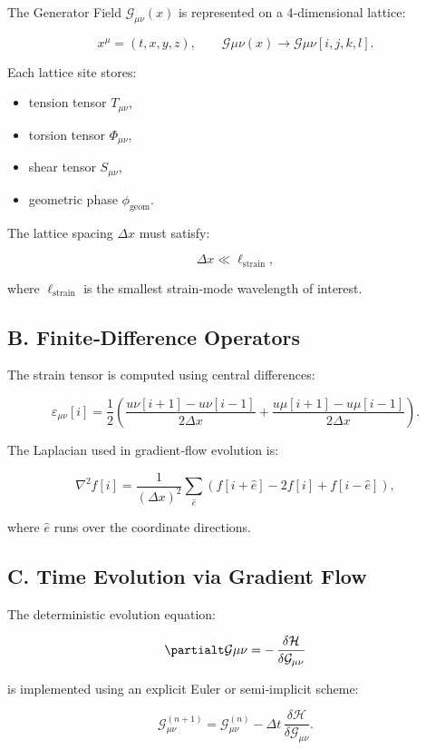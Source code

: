 \documentclass[reprint,amsmath,amssymb,aps,prl,floatfix]{revtex4-2}
\begin{document}
\begin{itemize}
The Generator Field \(\mathcal{G}_{\mu\nu}(x)\) is represented on a 4‑dimensional lattice:

\[
x^\mu = (t, x, y, z),
\qquad
\mathcal{G}{\mu\nu}(x) \rightarrow \mathcal{G}{\mu\nu}[i,j,k,l].
\]

Each lattice site stores:

\begin{itemize}
\item tension tensor \(T_{\mu\nu}\),  
\item torsion tensor \(\Phi_{\mu\nu}\),  
\item shear tensor \(S_{\mu\nu}\),  
\item geometric phase \(\phi_{\mathrm{geom}}\).
\end{itemize}

The lattice spacing \(\Delta x\) must satisfy:

\[
\Delta x \ll \ell_{\mathrm{strain}},
\]

where \(\ell_{\mathrm{strain}}\) is the smallest strain‑mode wavelength of interest.

\subsection{B. Finite‑Difference Operators}

The strain tensor is computed using central differences:

\[
\varepsilon_{\mu\nu}[i]
=
\frac{1}{2}
\left(
\frac{u\nu[i+1] - u\nu[i-1]}{2\Delta x}
+
\frac{u\mu[i+1] - u\mu[i-1]}{2\Delta x}
\right).
\]

The Laplacian used in gradient‑flow evolution is:

\[
\nabla^2 f[i]
=
\frac{1}{(\Delta x)^2}
\sum_{\hat{e}}
\left(
f[i+\hat{e}] - 2f[i] + f[i-\hat{e}]
\right),
\]

where \(\hat{e}\) runs over the coordinate directions.

\subsection{C. Time Evolution via Gradient Flow}

The deterministic evolution equation:

\[
\partialt \mathcal{G}{\mu\nu}
=
-\,\frac{\delta \mathcal{H}}{\delta \mathcal{G}_{\mu\nu}}
\]

is implemented using an explicit Euler or semi‑implicit scheme:

\[
\mathcal{G}_{\mu\nu}^{(n+1)}
=
\mathcal{G}_{\mu\nu}^{(n)}
-
\Delta t\,
\frac{\delta \mathcal{H}}{\delta \mathcal{G}_{\mu\nu}}.
\]


\end{itemize}
\end{document}
